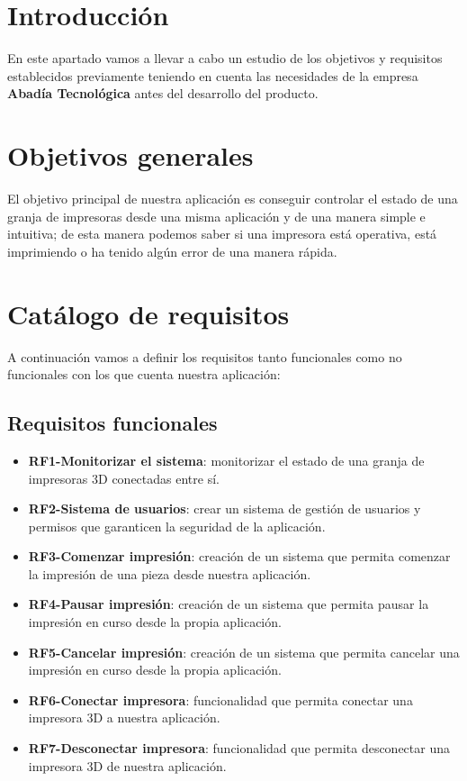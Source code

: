 
\section{Introducción}

En este apartado vamos a llevar a cabo un estudio de los objetivos y requisitos establecidos previamente teniendo en cuenta las necesidades de la empresa \textbf{Abadía Tecnológica} antes del desarrollo del producto.

\section{Objetivos generales}

El objetivo principal de nuestra aplicación es conseguir controlar el estado de una granja de impresoras desde una misma aplicación y de una manera simple e intuitiva; de esta manera podemos saber si una impresora está operativa, está imprimiendo o ha tenido algún error de una manera rápida.
\section{Catálogo de requisitos}
 
 A continuación vamos a definir los requisitos tanto funcionales como no funcionales con los que cuenta nuestra aplicación:

\subsection{Requisitos funcionales}

\begin{itemize}
\item \textbf{RF1-Monitorizar el sistema}: monitorizar el estado de una granja de impresoras 3D conectadas entre sí.
\item \textbf{RF2-Sistema de usuarios}: crear un sistema de gestión de usuarios y permisos que garanticen la seguridad de la aplicación.
\item \textbf{RF3-Comenzar impresión}: creación de un sistema que permita comenzar la impresión de una pieza desde nuestra aplicación.
\item \textbf{RF4-Pausar impresión}: creación de un sistema que permita pausar la impresión en curso desde la propia aplicación.
\item \textbf{RF5-Cancelar impresión}: creación de un sistema que permita cancelar una impresión en curso desde la propia aplicación.
\item \textbf{RF6-Conectar impresora}: funcionalidad que permita conectar una impresora 3D a  nuestra aplicación.
\item \textbf{RF7-Desconectar impresora}: funcionalidad que permita desconectar una impresora 3D de nuestra aplicación.
\end{itemize}

